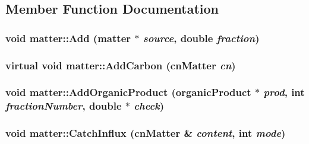 \subsection{Member Function Documentation}
\hypertarget{classmatter_a5cda91bc9eb0bfbc1fd1003cf574e39c}{
\subsubsection[{Add}]{\setlength{\rightskip}{0pt plus 5cm}void matter::Add ({\bf matter} $\ast$ {\em source}, \/  double {\em fraction})}}
\label{classmatter_a5cda91bc9eb0bfbc1fd1003cf574e39c}
\hypertarget{classmatter_a76a28967ecac20950fef8b4a875c0eaa}{
\subsubsection[{AddCarbon}]{\setlength{\rightskip}{0pt plus 5cm}virtual void matter::AddCarbon ({\bf cnMatter} {\em cn})}}
\label{classmatter_a76a28967ecac20950fef8b4a875c0eaa}
\hypertarget{classmatter_a7c9d44152352900088849c198d6495ce}{
\subsubsection[{AddOrganicProduct}]{\setlength{\rightskip}{0pt plus 5cm}void matter::AddOrganicProduct ({\bf organicProduct} $\ast$ {\em prod}, \/  int {\em fractionNumber}, \/  double $\ast$ {\em check})}}
\label{classmatter_a7c9d44152352900088849c198d6495ce}
\hypertarget{classmatter_a5ad9b7b66c194958cdf58ec47024c0c9}{
\subsubsection[{CatchInflux}]{\setlength{\rightskip}{0pt plus 5cm}void matter::CatchInflux ({\bf cnMatter} \& {\em content}, \/  int {\em mode})}}
\label{classmatter_a5ad9b7b66c194958cdf58ec47024c0c9}


